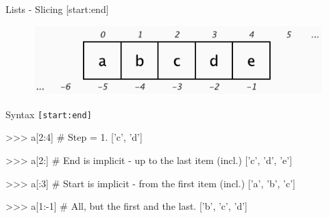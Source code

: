 \documentclass[10pt]{beamer}
\begin{document}
\begin{frame}[fragile]{Lists - Slicing [start:end]}

	\vspace*{-0.1cm}
	\begin{figure}[!h]
		\centering
		\includegraphics[width=0.6\linewidth]{img/slicing.pdf}
	\end{figure}

	\vspace*{-0.3cm}
	\pause
	Syntax \small{\texttt{[start:end]}}

	\pause
	\begin{pythoncode}
		>>> a[2:4]  # Step = 1.
		['c', 'd']
	\end{pythoncode}

	\pause
	\begin{pythoncode}
		>>> a[2:]  # End is implicit - up to the last item (incl.)
		['c', 'd', 'e']
	\end{pythoncode}

	\pause
	\begin{pythoncode}
		>>> a[:3]  # Start is implicit - from the first item (incl.)
		['a', 'b', 'c']
	\end{pythoncode}

	\pause
	\begin{pythoncode}
		>>> a[1:-1]  # All, but the first and the last.
		['b', 'c', 'd']
	\end{pythoncode}
\end{frame}
\end{document}
